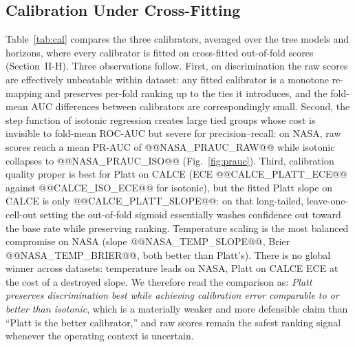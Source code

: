 \subsection{Calibration Under Cross-Fitting}
Table~\ref{tab:cal} compares the three calibrators, averaged over the tree models and horizons, where every calibrator is fitted on cross-fitted out-of-fold scores (Section~II-H). Three observations follow. First, on discrimination the raw scores are effectively unbeatable within dataset: any fitted calibrator is a monotone re-mapping and preserves per-fold ranking up to the ties it introduces, and the fold-mean AUC differences between calibrators are correspondingly small. Second, the step function of isotonic regression creates large tied groups whose cost is invisible to fold-mean ROC-AUC but severe for precision--recall: on NASA, raw scores reach a mean PR-AUC of @@NASA_PRAUC_RAW@@ while isotonic collapses to @@NASA_PRAUC_ISO@@ (Fig.~\ref{fig:prauc}). Third, calibration quality proper is best for Platt on CALCE (ECE @@CALCE_PLATT_ECE@@ against @@CALCE_ISO_ECE@@ for isotonic), but the fitted Platt slope on CALCE is only @@CALCE_PLATT_SLOPE@@: on that long-tailed, leave-one-cell-out setting the out-of-fold sigmoid essentially washes confidence out toward the base rate while preserving ranking. Temperature scaling is the most balanced compromise on NASA (slope @@NASA_TEMP_SLOPE@@, Brier @@NASA_TEMP_BRIER@@, both better than Platt's). There is no global winner across datasets: temperature leads on NASA, Platt on CALCE ECE at the cost of a destroyed slope. We therefore read the comparison as: \emph{Platt preserves discrimination best while achieving calibration error comparable to or better than isotonic}, which is a materially weaker and more defensible claim than ``Platt is the better calibrator,'' and raw scores remain the safest ranking signal whenever the operating context is uncertain.

\begin{table}[!t]
\caption{Calibration Quality Averaged Over Tree Models and Horizons. All Calibrators Are Fitted on Cross-Fitted Out-of-Fold Scores. Slope 1 / Intercept 0 Indicate Perfect Probabilistic Calibration.}
\label{tab:cal}
\centering
{}
\end{table}

